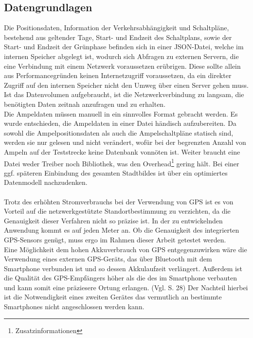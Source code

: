 \subsection{Datengrundlagen}
Die Positionsdaten, Information der Verkehrsabhängigkeit und Schaltpläne, bestehend aus geltender Tage, Start- und Endzeit des Schaltplans, sowie der Start- und Endzeit der Grünphase befinden sich in einer \gls{JSON}-Datei, welche im internen Speicher abgelegt ist, wodurch sich Abfragen zu externen Servern, die eine Verbindung mit einem Netzwerk voraussetzen erübrigen. Diese sollte allein aus Performancegründen keinen Internetzugriff voraussetzen, da ein direkter Zugriff auf den internen Speicher nicht den Umweg über einen Server gehen muss. Ist das Datenvolumen aufgebraucht, ist die Netzwerkverbindung zu langsam, die benötigten Daten zeitnah anzufragen und zu erhalten.\\
Die Ampeldaten müssen manuell in ein sinnvolles Format gebracht werden. Es wurde entschieden, die Ampeldaten in einer Datei händisch aufzubereiten. Da sowohl die Ampelpositionsdaten als auch die Ampelschaltpläne statisch sind, werden sie nur gelesen und nicht verändert, wofür bei der begrenzten Anzahl von Ampeln auf der Teststrecke keine Datenbank vonnöten ist. Weiter braucht eine Datei weder Treiber noch Bibliothek, was den Overhead\footnote{ Zusatzinformationen} gering hält. 
Bei einer ggf. späteren Einbindung des gesamten Stadtbildes ist über ein optimiertes Datenmodell nachzudenken. \\\\
Trotz des erhöhten Stromverbrauchs bei der Verwendung von \gls{GPS} ist es von Vorteil auf die netzwerkgestützte Standortbestimmung zu verzichten, da die Genauigkeit dieser Verfahren nicht so präzise ist. In der zu entwickelnden Anwendung kommt es auf jeden Meter an. Ob die Genauigkeit des integrierten \gls{GPS}-Sensors genügt, muss ergo im Rahmen dieser Arbeit getestet werden. \\
Eine Möglichkeit dem hohen Akkuverbrauch von \gls{GPS} entgegenzuwirken wäre die Verwendung eines externen \gls{GPS}-Geräts, das über Bluetooth mit dem \gls{Smartphone} verbunden ist und so dessen Akkulaufzeit verlängert. Außerdem ist die Qualität des \gls{GPS}-Empfängers höher als die des im \gls{Smartphone} verbauten und kann somit eine präziesere Ortung erlangen. (Vgl. \cite{gps} S. 28) Der Nachteil hierbei ist die Notwendigkeit eines zweiten Gerätes das vermutlich an bestimmte Smartphones nicht angeschlossen werden kann. 
\clearpage
